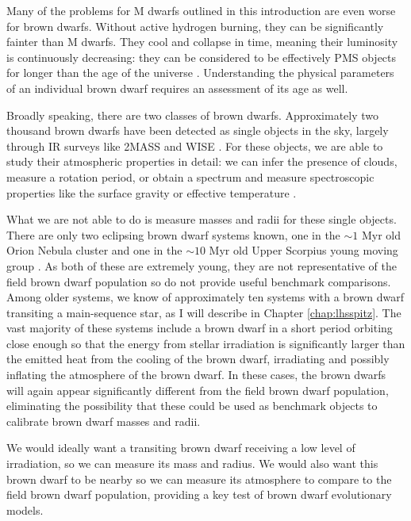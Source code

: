 \documentclass[12pt]{caltech_thesis}
\begin{document}
Many of the problems for M dwarfs outlined in this introduction are even worse for
brown dwarfs.
Without active hydrogen burning, they can be significantly fainter than M dwarfs.
They cool and collapse in time, meaning their luminosity is continuously decreasing:
they can be considered to be effectively PMS objects for longer than the age of the 
universe \citep{Burrows01}.
Understanding the physical parameters of an individual brown dwarf requires an assessment of its age as well.

Broadly speaking, there are two classes of brown dwarfs.
Approximately two thousand brown dwarfs have been detected as single objects in the sky,
largely through IR surveys like 2MASS and WISE \citep[e.g.][]{Kirkpatrick99, Kirkpatrick11}.
For these objects, we are able to study their atmospheric properties in detail: we can 
infer the presence of clouds, measure a rotation period, or obtain a spectrum and measure
spectroscopic properties like the surface gravity or effective temperature \citep[e.g.][]{Faherty14, Filippazzo15}. 

What we are not able to do is measure masses and radii for these single objects.
There are only two eclipsing brown dwarf systems known, one in the $\sim 1$ Myr old Orion
Nebula cluster and one in the $\sim 10$ Myr old Upper Scorpius young moving group
\citep{Stassun06, David16}.
As both of these are extremely young, they are not representative of the field brown dwarf
population so do not provide useful benchmark comparisons.
Among older systems, we know of approximately ten systems with a brown dwarf transiting a main-sequence star, as I will describe in Chapter \ref{chap:lhsspitz}.
The vast majority of these systems include a brown dwarf in a short period orbiting
close enough so that the energy from stellar irradiation is significantly larger than
the emitted heat from the cooling of the brown dwarf, irradiating and possibly inflating
the atmosphere of the brown dwarf.
In these cases, the brown dwarfs will again appear significantly different from the field
brown dwarf population, eliminating the possibility that these could be used as benchmark
objects to calibrate brown dwarf masses and radii.


We would ideally want a transiting brown dwarf receiving a low level of irradiation,
so we can measure its mass and radius.
We would also want this brown dwarf to be nearby so we can measure its atmosphere to
compare to the field brown dwarf population, providing a key test of brown dwarf
evolutionary models.
\end{document}
